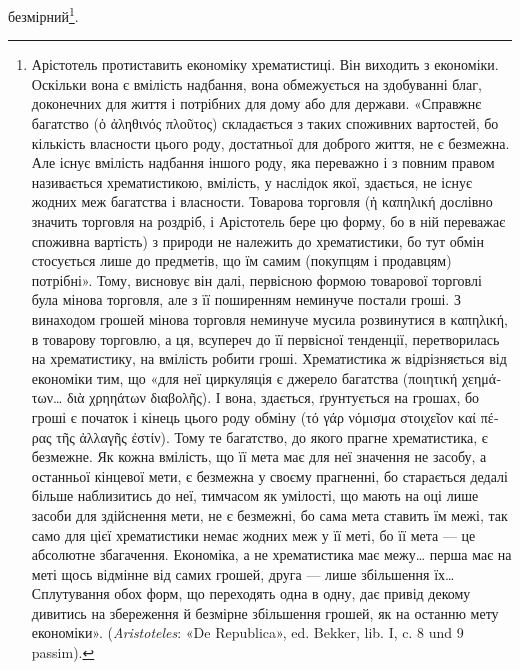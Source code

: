 безмірний\footnote{
Арістотель протиставить економіку хрематистиці. Він виходить
з економіки. Оскільки вона є вмілість надбання, вона обмежується на здобуванні
благ, доконечних для життя і потрібних для дому або для держави.
«Справжнє багатство (\textgreek{ὁ ἀληθινός πλοῦτος}) складається з таких споживних
вартостей, бо кількість власности цього роду, достатньої для
доброго життя, не є безмежна. Але існує вмілість надбання іншого роду,
яка переважно і з повним правом називається хрематистикою, вмілість,
у наслідок якої, здається, не існує жодних меж багатства і власности.
Товарова торговля (\textgreek{ἡ καπηλική} дослівно значить торговля на роздріб,
і Арістотель бере цю форму, бо в ній переважає споживна вартість) з природи
не належить до хрематистики, бо тут обмін стосується лише до предметів,
що їм самим (покупцям і продавцям) потрібні». Тому, висновує
він далі, первісною формою товарової торговлі була мінова торговля,
але з її поширенням неминуче постали гроші. З винаходом грошей мінова
торговля неминуче мусила розвинутися в \textgreek{καπηλική}, в товарову торговлю,
а ця, всупереч до її первісної тенденції, перетворилась на хрематистику,
на вмілість робити гроші. Хрематистика ж відрізняється від економіки
тим, що «для неї циркуляція є джерело багатства (\textgreek{ποιητική χεημάτων\dots{} διὰ χρηηάτων διαβολῆς}). І
вона, здається, ґрунтується на грошах, бо гроші є початок і кінець цього роду обміну (\textgreek{τό γάρ νόμισμα
στοιχεῖον καί πέρας τῆς ἀλλαγῆς ἐστίν}). Тому те багатство, до якого прагне хрематистика, є
безмежне. Як кожна вмілість, що її мета має для неї значення не засобу,
а останньої кінцевої мети, є безмежна у своєму прагненні, бо старається
дедалі більше наблизитись до неї, тимчасом як умілості, що мають на оці
лише засоби для здійснення мети, не є безмежні, бо сама мета ставить їм
межі, так само для цієї хрематистики немає жодних меж у її меті, бо її
мета — це абсолютне збагачення. Економіка, а не хрематистика має
межу\dots{} перша має на меті щось відмінне від самих грошей, друга — лише
збільшення їх\dots{} Сплутування обох форм, що переходять одна в одну, дає
привід декому дивитись на збереження й безмірне збільшення грошей,
як на останню мету економіки». (\emph{Aristoteles}: «De Republica», ed. Bekker,
lib. I, c. 8 und 9 passim).
}.

